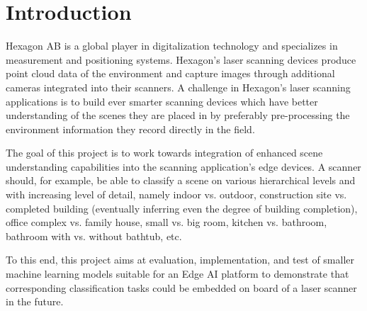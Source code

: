 \chapter{Introduction}
Hexagon AB\cite{hexagon} is a global player in digitalization technology and specializes in measurement and positioning systems.
Hexagon’s laser scanning devices produce point cloud data of the environment and capture images through additional cameras integrated into their scanners.
A challenge in Hexagon’s laser scanning applications is to build ever smarter scanning devices which have better understanding of the scenes they are placed in by preferably pre-processing the environment
information they record directly in the field.

The goal of this project is to work towards integration of enhanced scene understanding capabilities into the scanning application’s edge devices.
A scanner should, for example, be able to classify a scene on various hierarchical levels and with increasing level of detail, namely indoor vs. outdoor, construction site 
vs. completed building (eventually inferring even the degree of building completion), office complex vs.
family house, small vs. big room, kitchen vs. bathroom, bathroom with vs. without bathtub, etc.

To this end, this project aims at evaluation, implementation, and test of smaller machine learning models
suitable for an Edge AI platform to demonstrate that corresponding classification tasks
could be embedded on board of a laser scanner in the future.